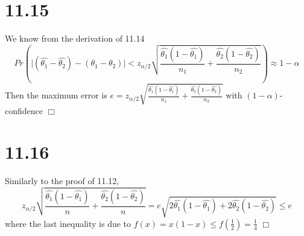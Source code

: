 \documentclass{article}
\begin{document}
\section*{11.15}
We know from the derivation of 11.14
$$Pr\left(\Big\lvert(\hat{\theta_1} - \hat{\theta_2}) - (\theta_1-\theta_2)\Big\rvert < z_{\alpha/2}\sqrt{\frac{\hat{\theta_1}(1-\hat{\theta_1})}{n_1} + \frac{\hat{\theta_2}(1-\hat{\theta_2})}{n_2}}\right) \approx 1-\alpha$$
Then the maximum error is $e = z_{\alpha/2}\sqrt{\frac{\hat{\theta_1}(1-\hat{\theta_1})}{n_1} + \frac{\hat{\theta_2}(1-\hat{\theta_2})}{n_2}}$ with $(1-\alpha)$-confidence $\Box$

\section*{11.16}
Similarly to the proof of 11.12,
$$z_{\alpha/2}\sqrt{\frac{\hat{\theta_1}(1-\hat{\theta_1})}{n} + \frac{\hat{\theta_2}(1-\hat{\theta_2})}{n}} = e\sqrt{2\hat{\theta_1}(1-\hat{\theta_1}) + 2\hat{\theta_2}(1-\hat{\theta_2})} \leqslant e$$
where the last inequality is due to $f(x) = x(1-x) \leqslant f(\frac{1}{2}) = \frac{1}{4}$ $\Box$
\end{document}
